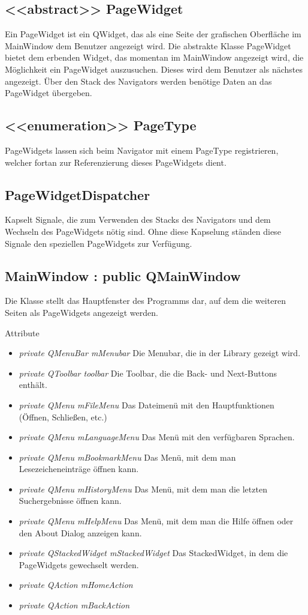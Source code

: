 \subsection*{<<abstract>> PageWidget}
Ein PageWidget ist ein QWidget, das als eine Seite der grafischen Oberfläche im MainWindow dem Benutzer angezeigt wird. Die abstrakte Klasse PageWidget bietet dem erbenden Widget, das momentan im MainWindow angezeigt wird, die Möglichkeit ein PageWidget auszusuchen. Dieses wird dem Benutzer als nächstes angezeigt. Über den Stack des Navigators werden benötige Daten an das PageWidget übergeben.

\subsection*{<<enumeration>> PageType}
PageWidgets lassen sich beim Navigator mit einem PageType registrieren, welcher fortan zur Referenzierung dieses PageWidgets dient.

\subsection*{PageWidgetDispatcher}
Kapselt Signale, die zum Verwenden des Stacks des Navigators und dem Wechseln des PageWidgets nötig sind. Ohne diese Kapselung ständen diese Signale den speziellen PageWidgets zur Verfügung.

\subsection*{MainWindow : public QMainWindow}
Die Klasse stellt das Hauptfenster des Programms dar, auf dem die weiteren Seiten als PageWidgets angezeigt werden.

Attribute
\begin{itemize}
	\item\textit{private QMenuBar mMenubar}
	Die Menubar, die in der Library gezeigt wird.   
	\item\textit{private QToolbar toolbar}
	Die Toolbar, die die Back- und Next-Buttons enthält.
	\item\textit{private QMenu mFileMenu}
	Das Dateimenü mit den Hauptfunktionen (Öffnen, Schließen, etc.)
	\item\textit{private QMenu mLanguageMenu}
	Das Menü mit den verfügbaren Sprachen.
	\item\textit{private QMenu mBookmarkMenu}
	Das Menü, mit dem man Lesezeicheneinträge öffnen kann.
	\item\textit{private QMenu mHistoryMenu}
	Das Menü, mit dem man die letzten Suchergebnisse öffnen kann.
	\item\textit{private QMenu mHelpMenu}
	Das Menü, mit dem man die Hilfe öffnen oder den About Dialog anzeigen kann.
	\item\textit{private QStackedWidget mStackedWidget}
	Das StackedWidget, in dem die PageWidgets gewechselt werden.
	\item\textit{private QAction mHomeAction}
	\item\textit{private QAction mBackAction}
\end{itemize}

